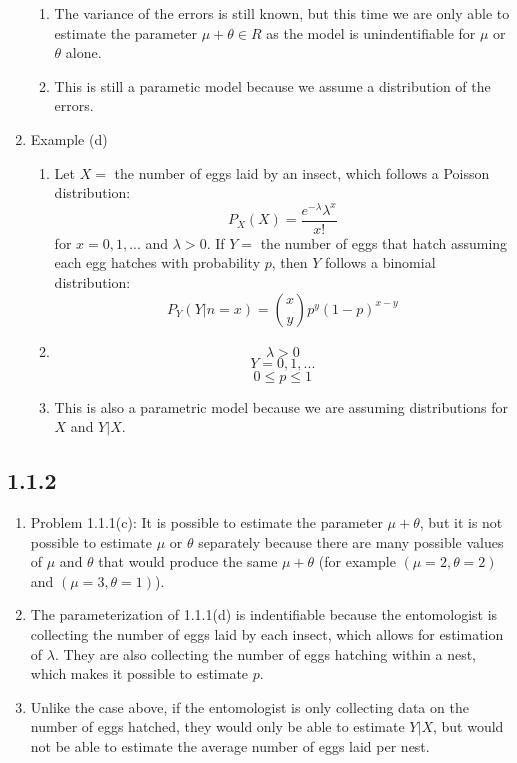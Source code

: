 \documentclass[a4paper,12pt]{article}
\begin{document}
\begin{enumerate}
\begin{enumerate}
      \item The variance of the errors is still known, but this time we are only able to estimate the parameter $\mu+\theta\in R$ as the model is unindentifiable for $\mu$ or $\theta$ alone.
      \item This is still a parametic model because we assume a distribution of the errors.
    \end{enumerate}
    \item Example (d)
    \begin{enumerate}
       \item Let $X=$ the number of eggs laid by an insect, which follows a Poisson distribution:$$P_X(X)=\frac{e^{-\lambda}\lambda^x}{x!}$$ for $x=0,1,...$ and $\lambda>0$. If $Y=$ the number of eggs that hatch assuming each egg hatches with probability $p$, then $Y$ follows a binomial distribution:$$P_Y(Y|n=x)={x\choose y}p^y(1-p)^{x-y}$$
       \item $$\lambda>0$$ $$Y=0,1,...$$ $$0\leq p\leq 1$$
       \item This is also a parametric model because we are assuming distributions for $X$ and $Y|X$.
     \end{enumerate}
\end{enumerate}
\subsection{1.1.2}
\begin{enumerate}
  \item Problem 1.1.1(c): It is possible to estimate the parameter $\mu+\theta$, but it is not possible to estimate $\mu$ or $\theta$ separately because there are many possible values of $\mu$ and $\theta$ that would produce the same $\mu+\theta$ (for example $(\mu=2,\theta=2)$ and $(\mu=3,\theta=1)$).
  \item The parameterization of 1.1.1(d) is indentifiable because the entomologist is collecting the number of eggs laid by each insect, which allows for estimation of $\lambda$. They are also collecting the number of eggs hatching within a nest, which makes it possible to estimate $p$.
  \item Unlike the case above, if the entomologist is only collecting data on the number of eggs hatched, they would only be able to estimate $Y|X$, but would not be able to estimate the average number of eggs laid per nest.
\end{enumerate}
\end{document}
